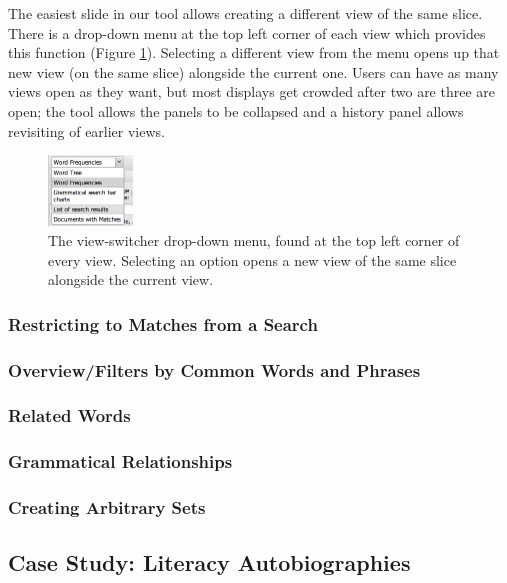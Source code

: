 \documentclass{sig-alternate}
\begin{document}
The easiest slide in our tool allows creating a different view of the same slice.  There is a drop-down menu at the top left corner of each view which provides this function (Figure \ref{fig:chris03}).  Selecting a different view from the menu opens up that new view (on the same slice) alongside the current one. Users can have as many views open as they want, but most displays get crowded after two are three are open; the tool allows the panels to be collapsed and a history panel allows revisiting of earlier views.  
\begin{figure}[h!]
\includegraphics[width=0.2\textwidth]{fig/chris/03.png}
\caption{ The view-switcher drop-down menu, found at the top left corner of every view. Selecting an option opens a new view  of the same slice alongside the current view. \label{fig:chris03}}
\end{figure}

\subsubsection{Restricting to Matches from a Search}


\subsubsection{Overview/Filters by Common Words and Phrases }


\subsubsection{Related Words}

\subsubsection{Grammatical Relationships}

\subsubsection {Creating Arbitrary Sets}


\subsection{Case Study: Literacy Autobiographies}
\end{document}
